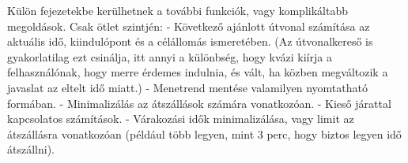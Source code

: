 
Külön fejezetekbe kerülhetnek a további funkciók, vagy komplikáltabb megoldások. Csak ötlet szintjén:
- Következő ajánlott útvonal számítása az aktuális idő, kiindulópont és a célállomás ismeretében. (Az útvonalkereső is gyakorlatilag ezt csinálja, itt annyi a különbség, hogy kvázi kiírja a felhasználónak, hogy merre érdemes indulnia, és vált, ha közben megváltozik a javaslat az eltelt idő miatt.)
- Menetrend mentése valamilyen nyomtatható formában.
- Minimalizálás az átszállások számára vonatkozóan.
- Kieső járattal kapcsolatos számítások.
- Várakozási idők minimalizálása, vagy limit az átszállásra vonatkozóan (például több legyen, mint 3 perc, hogy biztos legyen idő átszállni).